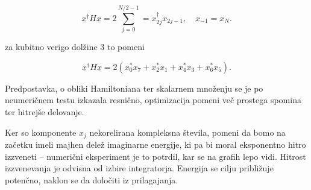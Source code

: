 \documentclass[a4 paper, 12pt]{article}
\begin{document}
\begin{equation}
	\underline{x}^\dagger H \underline{x} = 2\sum_{j = 0}^{N/2 - 1} = x^\dagger_{2j}x_{2j-1}, \quad x_{-1} = x_N.
\end{equation}

za kubitno verigo dolžine 3 to pomeni

\[
	\underline{x}^\dagger H \underline{x} = 2 (x_0^* x_7 + x_2^* x_1 + x_4^*x_3 + x_6^*x_5).
\]

Predpostavka, o obliki Hamiltoniana ter skalarnem množenju se je po neumeričnem testu izkazala resnično, optimizacija
pomeni več prostega spomina ter hitrejše delovanje.

Ker so komponente $x_j$ nekorelirana kompleksna števila, pomeni da bomo na začetku imeli majhen delež imaginarne
energije, ki pa bi moral eksponentno hitro izzveneti -- numerični eksperiment je to potrdil, kar se na grafih lepo vidi.
Hitrost izzvenevanja je odvisna od izbire integratorja.
Energija se cilju približuje potenčno, naklon se da določiti iz prilagajanja.
\end{document}
